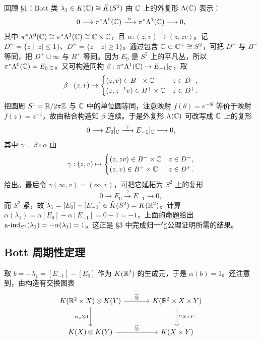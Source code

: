 \begin{example}
回顾 §1：Bott 类 $\lambda_1\in K(\mathbb{C})\cong\tilde K(S^2)$ 由 $\mathbb{C}$ 上的外复形 $\Lambda(\mathbb{C})$ 表示：
\[
0\longrightarrow\pi^*\Lambda^0(\C)\xrightarrow{\ \alpha\ }\pi^*\Lambda^1(\C)\longrightarrow 0,
\]
其中 $\pi^*\Lambda^0(\mathbb{C})\cong\pi^*\Lambda^1(\mathbb{C})\cong\mathbb{C}\times\mathbb{C}$，且 $\alpha:(z,v)\mapsto(z,zv)$。记 $D^-=\{z\mid |z|\le1\}$、$D^+=\{z\mid |z|\ge1\}$。通过包含 $\mathbb{C}\subset\mathbb{C}^+\cong S^2$，可把 $D^-$ 与 $B^-$ 等同，把 $D^+\cup\infty$ 与 $B^+$ 等同。因为 $E_0$ 是 $S^2$ 上的平凡丛，所以 $\pi^*\Lambda^0(\mathbb{C})=E_0|_{\mathbb{C}}$。又可构造同构 $\beta:\pi^*\Lambda^1(\mathbb{C})\to E_{-1}|_{\mathbb{C}}$，取
\[
\beta:(z,v)\mapsto\begin{cases}(z,v)\in B^-\times\mathbb{C} & z\in D^-,\\(z,z^{-1}v)\in B^+\times\mathbb{C} & z\in D^+.\end{cases}
\]
把圆周 $S^1=\mathbb{R}/2\pi\mathbb{Z}$ 与 $\mathbb{C}$ 中的单位圆等同，注意映射 $f(\theta)=e^{-i\theta}$ 等价于映射 $f(z)=z^{-1}$，故由粘合构造知 $\beta$ 连续。于是外复形 $\Lambda(\mathbb{C})$ 可改写成 $\mathbb{C}$ 上的复形
\[
0\longrightarrow E_0|_\C\xrightarrow{\ \gamma\ }E_{-1}|_\C\longrightarrow 0,
\]
其中 $\gamma=\beta\circ\alpha$ 由
\[
\gamma:(z,v)\mapsto\begin{cases}(z,zv)\in B^-\times\mathbb{C} & z\in D^-,\\(z,v)\in B^+\times\mathbb{C} & z\in D^+.\end{cases}
\]
给出。最后令 $\gamma(\infty,v)=(\infty,v)$，可把它延拓为 $S^2$ 上的复形
\[
0\longrightarrow E_0\xrightarrow{\ \gamma\ }E_{-1}\longrightarrow 0,
\]
而 $S^2$ 紧，故 $\lambda_1=[E_0]-[E_{-1}]\in\tilde K(S^2)=K(\mathbb{R}^2)$。计算 $\alpha(\lambda_1)=\alpha[E_0]-\alpha[E_{-1}]=0-1=-1$，上面的命题给出 $\operatorname{a\text{-}ind}_{S^1}(\lambda_1)=-\alpha(\lambda_1)=1$。这正是 §3 中完成归一化公理证明所需的结果。
\end{example}


\subsection{Bott 周期性定理}

取 $b=-\lambda_1=[E_{-1}]-[E_0]$ 作为 $K(\mathbb{R}^2)$ 的生成元，于是 $\alpha(b)=1$。还注意到，由构造有交换图表
\[
\begin{tikzcd}[row sep=large, column sep=large]
K(\R^2\times X)\otimes K(Y) \arrow[r,"\BT"] \arrow[d,"\alpha_x\otimes1"'] & K(\R^2\times X\times Y) \arrow[d,"\alpha_{X\times Y}"] \\
K(X)\otimes K(Y) \arrow[r,"\BT"] & K(X\times Y)
\end{tikzcd}
\]

